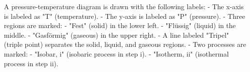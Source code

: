 A pressure-temperature diagram is drawn with the following labels:  
- The x-axis is labeled as "T" (temperature).  
- The y-axis is labeled as "P" (pressure).  
- Three regions are marked:  
  - "Fest" (solid) in the lower left.  
  - "Flüssig" (liquid) in the middle.  
  - "Gasförmig" (gaseous) in the upper right.  
- A line labeled "Tripel" (triple point) separates the solid, liquid, and gaseous regions.  
- Two processes are marked:  
  - "Isobar, i" (isobaric process in step i).  
  - "Isotherm, ii" (isothermal process in step ii).